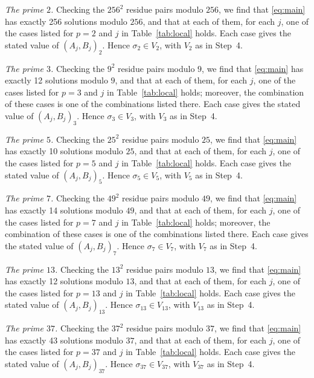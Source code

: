 \documentclass[11pt]{article}
\begin{document}
\emph{The prime $2$.} Checking the $256^2$ residue pairs modulo $256$, we find that \eqref{eq:main} has exactly 256 solutions modulo $256$, and that at each of them, for each $j$, one of the cases listed for $p=2$ and $j$ in Table~\ref{tab:local} holds. Each case gives the stated value of $(A_j,B_j)_{2}$. Hence $\sigma_{2}\in V_{2}$, with $V_{2}$ as in Step~4.

\emph{The prime $3$.} Checking the $9^2$ residue pairs modulo $9$, we find that \eqref{eq:main} has exactly 12 solutions modulo $9$, and that at each of them, for each $j$, one of the cases listed for $p=3$ and $j$ in Table~\ref{tab:local} holds; moreover, the combination of these cases is one of the combinations listed there. Each case gives the stated value of $(A_j,B_j)_{3}$. Hence $\sigma_{3}\in V_{3}$, with $V_{3}$ as in Step~4.

\emph{The prime $5$.} Checking the $25^2$ residue pairs modulo $25$, we find that \eqref{eq:main} has exactly 10 solutions modulo $25$, and that at each of them, for each $j$, one of the cases listed for $p=5$ and $j$ in Table~\ref{tab:local} holds. Each case gives the stated value of $(A_j,B_j)_{5}$. Hence $\sigma_{5}\in V_{5}$, with $V_{5}$ as in Step~4.

\emph{The prime $7$.} Checking the $49^2$ residue pairs modulo $49$, we find that \eqref{eq:main} has exactly 14 solutions modulo $49$, and that at each of them, for each $j$, one of the cases listed for $p=7$ and $j$ in Table~\ref{tab:local} holds; moreover, the combination of these cases is one of the combinations listed there. Each case gives the stated value of $(A_j,B_j)_{7}$. Hence $\sigma_{7}\in V_{7}$, with $V_{7}$ as in Step~4.

\emph{The prime $13$.} Checking the $13^2$ residue pairs modulo $13$, we find that \eqref{eq:main} has exactly 12 solutions modulo $13$, and that at each of them, for each $j$, one of the cases listed for $p=13$ and $j$ in Table~\ref{tab:local} holds. Each case gives the stated value of $(A_j,B_j)_{13}$. Hence $\sigma_{13}\in V_{13}$, with $V_{13}$ as in Step~4.

\emph{The prime $37$.} Checking the $37^2$ residue pairs modulo $37$, we find that \eqref{eq:main} has exactly 43 solutions modulo $37$, and that at each of them, for each $j$, one of the cases listed for $p=37$ and $j$ in Table~\ref{tab:local} holds. Each case gives the stated value of $(A_j,B_j)_{37}$. Hence $\sigma_{37}\in V_{37}$, with $V_{37}$ as in Step~4.
\end{document}
